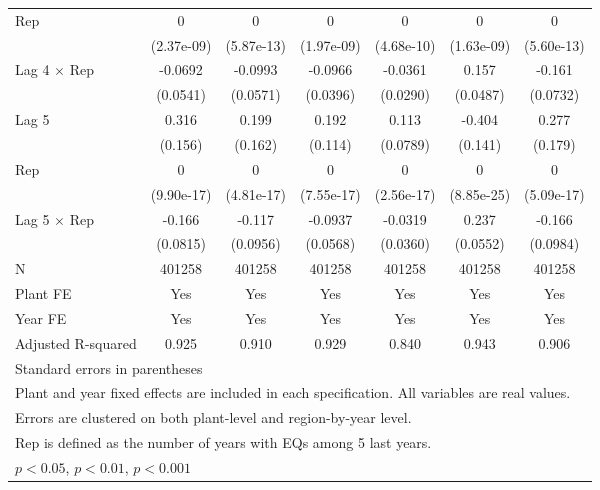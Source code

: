 \begin{table}[htbp]
\begin{tabular}{l*{6}{c}}
\addlinespace
Rep             &        0         &        0         &        0         &        0         &        0         &        0         \\
                &(2.37e-09)         &(5.87e-13)         &(1.97e-09)         &(4.68e-10)         &(1.63e-09)         &(5.60e-13)         \\
\addlinespace
Lag 4 $\times$ Rep&  -0.0692         &  -0.0993         &  -0.0966\sym{*}  &  -0.0361         &    0.157\sym{**} &   -0.161\sym{*}  \\
                & (0.0541)         & (0.0571)         & (0.0396)         & (0.0290)         & (0.0487)         & (0.0732)         \\
\addlinespace
Lag 5           &    0.316\sym{*}  &    0.199         &    0.192         &    0.113         &   -0.404\sym{**} &    0.277         \\
                &  (0.156)         &  (0.162)         &  (0.114)         & (0.0789)         &  (0.141)         &  (0.179)         \\
\addlinespace
Rep             &        0         &        0         &        0         &        0         &        0         &        0         \\
                &(9.90e-17)         &(4.81e-17)         &(7.55e-17)         &(2.56e-17)         &(8.85e-25)         &(5.09e-17)         \\
\addlinespace
Lag 5 $\times$ Rep&   -0.166\sym{*}  &   -0.117         &  -0.0937         &  -0.0319         &    0.237\sym{***}&   -0.166         \\
                & (0.0815)         & (0.0956)         & (0.0568)         & (0.0360)         & (0.0552)         & (0.0984)         \\
\midrule
N               &   401258         &   401258         &   401258         &   401258         &   401258         &   401258         \\
Plant FE        &      Yes         &      Yes         &      Yes         &      Yes         &      Yes         &      Yes         \\
Year FE         &      Yes         &      Yes         &      Yes         &      Yes         &      Yes         &      Yes         \\
Adjusted R-squared&    0.925         &    0.910         &    0.929         &    0.840         &    0.943         &    0.906         \\
\bottomrule
\multicolumn{7}{l}{\footnotesize Standard errors in parentheses}\\
\multicolumn{7}{l}{\footnotesize Plant and year fixed effects are included in each specification. All variables are real values.}\\
\multicolumn{7}{l}{\footnotesize Errors are clustered on both plant-level and region-by-year level.}\\
\multicolumn{7}{l}{\footnotesize Rep is defined as the number of years with EQs among 5 last years.}\\
\multicolumn{7}{l}{\footnotesize \sym{*} \(p<0.05\), \sym{**} \(p<0.01\), \sym{***} \(p<0.001\)}\\
\end{tabular}
\end{table}
